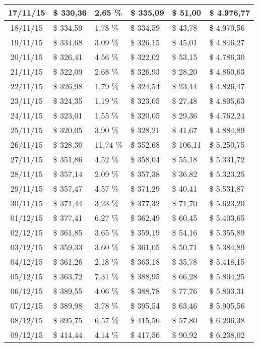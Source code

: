 \begin{small}
\begin{longtable}{|c|l|l|l|l|l|}
17/11/15 & \$ 330,36 & 2,65 \% & \$ 335,09 & \$ 51,00 & \$ 4.976,77 \\ \hline
18/11/15 & \$ 334,59 & 1,78 \% & \$ 334,59 & \$ 43,78 & \$ 4.970,56 \\ \hline
19/11/15 & \$ 334,68 & 3,09 \% & \$ 326,15 & \$ 45,01 & \$ 4.846,27 \\ \hline
20/11/15 & \$ 326,41 & 4,56 \% & \$ 322,02 & \$ 53,15 & \$ 4.786,30 \\ \hline
21/11/15 & \$ 322,09 & 2,68 \% & \$ 326,93 & \$ 28,20 & \$ 4.860,63 \\ \hline
22/11/15 & \$ 326,98 & 1,79 \% & \$ 324,54 & \$ 23,44 & \$ 4.826,47 \\ \hline
23/11/15 & \$ 324,35 & 1,19 \% & \$ 323,05 & \$ 27,48 & \$ 4.805,63 \\ \hline
24/11/15 & \$ 323,01 & 1,55 \% & \$ 320,05 & \$ 29,36 & \$ 4.762,24 \\ \hline
25/11/15 & \$ 320,05 & 3,90 \% & \$ 328,21 & \$ 41,67 & \$ 4.884,89 \\ \hline
26/11/15 & \$ 328,30 & 11,74 \% & \$ 352,68 & \$ 106,11 & \$ 5.250,75 \\ \hline
27/11/15 & \$ 351,86 & 4,52 \% & \$ 358,04 & \$ 55,18 & \$ 5.331,72 \\ \hline
28/11/15 & \$ 357,14 & 2,09 \% & \$ 357,38 & \$ 36,82 & \$ 5.323,25 \\ \hline
29/11/15 & \$ 357,47 & 4,57 \% & \$ 371,29 & \$ 40,41 & \$ 5.531,87 \\ \hline
30/11/15 & \$ 371,44 & 3,23 \% & \$ 377,32 & \$ 71,70 & \$ 5.623,20 \\ \hline
01/12/15 & \$ 377,41 & 6,27 \% & \$ 362,49 & \$ 60,45 & \$ 5.403,65 \\ \hline
02/12/15 & \$ 361,85 & 3,65 \% & \$ 359,19 & \$ 54,16 & \$ 5.355,89 \\ \hline
03/12/15 & \$ 359,33 & 3,60 \% & \$ 361,05 & \$ 50,71 & \$ 5.384,89 \\ \hline
04/12/15 & \$ 361,26 & 2,18 \% & \$ 363,18 & \$ 35,78 & \$ 5.418,15 \\ \hline
05/12/15 & \$ 363,72 & 7,31 \% & \$ 388,95 & \$ 66,28 & \$ 5.804,25 \\ \hline
06/12/15 & \$ 389,55 & 4,06 \% & \$ 388,78 & \$ 77,76 & \$ 5.803,31 \\ \hline
07/12/15 & \$ 389,98 & 3,78 \% & \$ 395,54 & \$ 63,46 & \$ 5.905,56 \\ \hline
08/12/15 & \$ 395,75 & 6,57 \% & \$ 415,56 & \$ 57,80 & \$ 6.206,38 \\ \hline
09/12/15 & \$ 414,44 & 4,14 \% & \$ 417,56 & \$ 90,92 & \$ 6.238,02 \\ \hline

\end{longtable}
\end{small}
